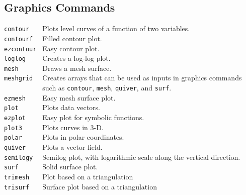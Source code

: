 \subsection*{Graphics Commands}
\verb&contour   & Plots level curves of a function of two variables.\\
\verb&contourf  & Filled contour plot.\\
\verb&ezcontour & Easy contour plot.\\
\verb&loglog    & Creates a log-log plot.\\
\verb&mesh      & Draws a mesh surface.\\
\verb&meshgrid  & Creates arrays that can be used as inputs in graphics commands \\
\verb&          &  such as \verb&contour&, \verb&mesh&, \verb&quiver&, and \verb&surf&.\\
\verb&ezmesh    & Easy mesh surface plot.\\
\verb&plot      & Plots data vectors.\\
\verb&ezplot    & Easy plot for symbolic functions.\\
\verb&plot3     & Plots curves in 3-D.\\
\verb&polar     & Plots in polar coordinates.\\
\verb&quiver    & Plots a vector field.\\
\verb&semilogy  & Semilog plot, with logarithmic scale along the vertical direction.\\
\verb&surf      & Solid surface plot.\\
\verb&trimesh   & Plot based on a triangulation\\
\verb&trisurf   & Surface plot based on a triangulation





